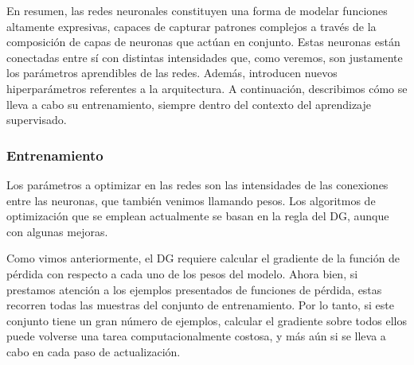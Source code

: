 \documentclass[../../main.tex]{subfiles}
\begin{document}

\bigskip
En resumen, las redes neuronales constituyen una forma de modelar funciones altamente
expresivas, capaces de capturar patrones complejos a través de la composición de capas de
neuronas que actúan en conjunto. Estas neuronas están conectadas entre sí con distintas
intensidades que, como veremos, son justamente los parámetros aprendibles de las redes.
Además, introducen nuevos hiperparámetros referentes a la arquitectura. A continuación,
describimos cómo se lleva a cabo su entrenamiento, siempre dentro del contexto del
aprendizaje supervisado.

\subsubsection{Entrenamiento}
Los parámetros a optimizar en las redes son las intensidades de las conexiones entre las
neuronas, que también venimos llamando pesos. Los algoritmos de optimización que se
emplean actualmente se basan en la regla del DG, aunque con algunas mejoras.

Como vimos anteriormente, el DG requiere calcular el gradiente de la función de pérdida
con respecto a cada uno de los pesos del modelo. Ahora bien, si prestamos atención a los
ejemplos presentados de funciones de pérdida, estas recorren todas las muestras del
conjunto de entrenamiento. Por lo tanto, si este conjunto tiene un gran número de
ejemplos, calcular el gradiente sobre todos ellos puede volverse una tarea
computacionalmente costosa, y más aún si se lleva a cabo en cada paso de actualización.
\end{document}
